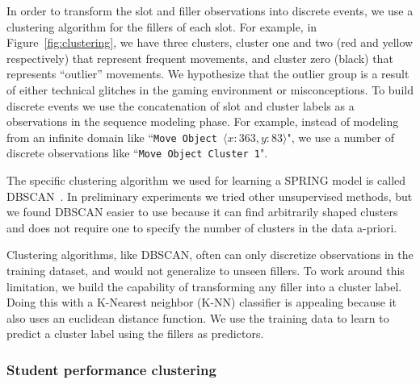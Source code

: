\documentclass{sigchi}
\newcommand{\hl}[1]{\colorbox{yellow}{#1}}
\begin{document}
In order to transform the slot and filler observations into discrete events, we use a clustering algorithm for the fillers of each slot.
For example, in Figure~\ref{fig:clustering}, %
we have three clusters,  cluster one and two (red and yellow respectively) that represent frequent movements, and cluster zero (black) that represents ``outlier'' movements.
We hypothesize that the outlier group is a result of either technical glitches in the gaming environment or misconceptions.
To build discrete events we use the  concatenation of slot and cluster labels as a  observations in the sequence modeling phase.
For example, instead of modeling from an infinite  domain like ``\texttt{Move Object $\langle x:363, y:83 \rangle$}",
we use a number of discrete observations like ``\texttt{Move Object Cluster 1}".

The specific clustering algorithm we used  for learning a SPRING model is  called DBSCAN~\cite{ester1996density}.
In preliminary experiments we tried other  unsupervised methods, but  we found DBSCAN easier to use because it can find arbitrarily shaped clusters and does not require one to specify the number of clusters in the data a-priori.


Clustering algorithms, like DBSCAN, often can only discretize observations in the training dataset, and would not generalize to unseen fillers.
To work around this limitation, we build the capability of transforming any  filler into a cluster label. 
Doing this with a K-Nearest neighbor (K-NN) classifier is appealing because it also uses an euclidean distance function.
We use the training data to learn to predict a cluster label using the fillers as predictors.


\subsubsection{Student performance clustering}
\label{sec:student_disc}
\end{document}
